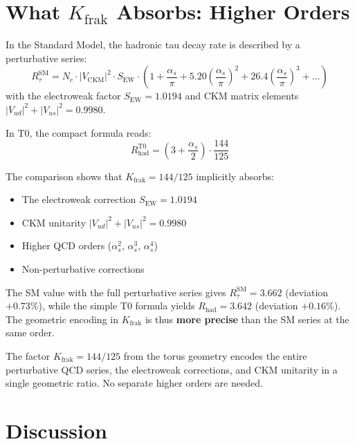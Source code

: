 	
	\section{What $K_\text{frak}$ Absorbs: Higher Orders}
	\label{sec:higher}
	
	In the Standard Model, the hadronic tau decay rate is described by a perturbative series:
	\begin{equation}
		R_\tau^\text{SM} = N_c \cdot |V_\text{CKM}|^2 \cdot S_\text{EW} \cdot \left(1 + \frac{\alpha_s}{\pi} + 5.20 \left(\frac{\alpha_s}{\pi}\right)^2 + 26.4 \left(\frac{\alpha_s}{\pi}\right)^3 + \ldots\right)
	\end{equation}
	with the electroweak factor $S_\text{EW} = 1.0194$ and CKM matrix elements $|V_{ud}|^2 + |V_{us}|^2 = 0.9980$.
	
	In T0, the compact formula reads:
	\begin{equation}
		R_\text{had}^\text{T0} = \left(3 + \frac{\alpha_s}{2}\right) \cdot \frac{144}{125}
	\end{equation}
	
	The comparison shows that $K_\text{frak} = 144/125$ implicitly absorbs:
	\begin{itemize}
		\item The electroweak correction $S_\text{EW} = 1.0194$
		\item CKM unitarity $|V_{ud}|^2 + |V_{us}|^2 = 0.9980$
		\item Higher QCD orders ($\alpha_s^2$, $\alpha_s^3$, $\alpha_s^4$)
		\item Non-perturbative corrections
	\end{itemize}
	
	The SM value with the full perturbative series gives $R_\tau^\text{SM} = 3.662$ (deviation $+0.73\%$), while the simple T0 formula yields $R_\text{had} = 3.642$ (deviation $+0.16\%$). The geometric encoding in $K_\text{frak}$ is thus \textbf{more precise} than the SM series at the same order.
	
	\begin{keypoint}
		The factor $K_\text{frak} = 144/125$ from the torus geometry encodes the entire perturbative QCD series, the electroweak corrections, and CKM unitarity in a single geometric ratio. No separate higher orders are needed.
	\end{keypoint}
	
	
	\section{Discussion}
	
